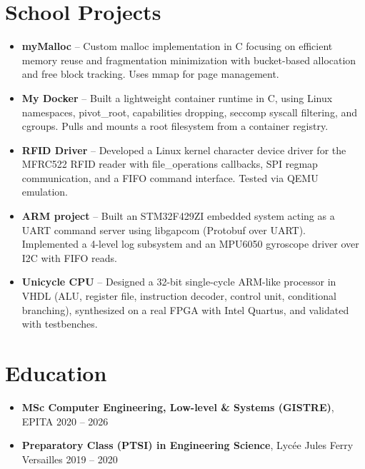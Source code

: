 \documentclass[9pt,a4paper]{article}
\begin{document}
\section*{School Projects}
\begin{tcolorbox}[mybox]
\begin{itemize}
\item \textbf{myMalloc} -- Custom malloc implementation in C focusing on efficient memory reuse and fragmentation minimization with bucket-based allocation and free block tracking. Uses mmap for page management.

\item \textbf{My Docker} -- Built a lightweight container runtime in C, using Linux namespaces, pivot\_root, capabilities dropping, seccomp syscall filtering, and cgroups. Pulls and mounts a root filesystem from a container registry.

\item \textbf{RFID Driver} -- Developed a Linux kernel character device driver for the MFRC522 RFID reader with file\_operations callbacks, SPI regmap communication, and a FIFO command interface. Tested via QEMU emulation.

\item \textbf{ARM project} -- Built an STM32F429ZI embedded system acting as a UART command server using libgapcom (Protobuf over UART). Implemented a 4-level log subsystem and an MPU6050 gyroscope driver over I2C with FIFO reads.

\item \textbf{Unicycle CPU} -- Designed a 32-bit single-cycle ARM-like processor in VHDL (ALU, register file, instruction decoder, control unit, conditional branching), synthesized on a real FPGA with Intel Quartus, and validated with testbenches.
\end{itemize}
\end{tcolorbox}


\section*{Education}
\begin{tcolorbox}[mybox]
\begin{itemize}
\item \textbf{MSc Computer Engineering, Low-level \& Systems (GISTRE)}, EPITA {\small{\hfill 2020 – 2026}}

\item \textbf{Preparatory Class (PTSI) in Engineering Science}, Lycée Jules Ferry Versailles {\small{\hfill 2019 – 2020}}
\end{itemize}
\end{tcolorbox}
\end{document}
